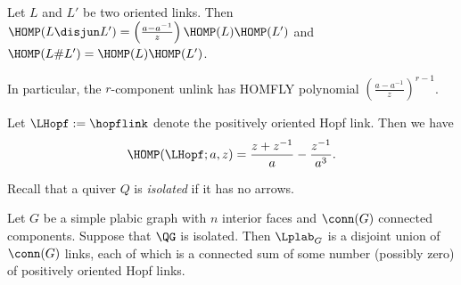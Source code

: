 \begin{proposition}\label{prop:FLYsum}
Let $L$ and $L'$ be two oriented links.  Then $\HOMP(L \disjun L') = \left(\frac{a-a^{-1}}{z}\right)\HOMP(L)\HOMP(L')$ and $\HOMP(L \#L') = \HOMP(L) \HOMP(L')$. 
\end{proposition}
In particular, the $r$-component unlink has HOMFLY polynomial $\left(\frac{a-a^{-1}}{z}\right)^{r-1}$.

Let $\LHopf:=\hopflink$ denote the positively oriented Hopf link.  Then we have 
\begin{equation}\label{eq:Hopf}
\HOMP({\LHopf};a,z) = \frac{z + z^{-1}}{a} - \frac{z^{-1}}{a^{3}}.
\end{equation}



Recall that a quiver $Q$ is \emph{isolated} if it has no arrows.
\begin{proposition}\label{prop:plabic_isolated}
Let $G$ be a simple plabic graph with $n$ interior faces and $\conn(G)$ connected components. Suppose that $\QG$ is isolated. Then $\Lplab_G$ is a disjoint union of $\conn(G)$ links, each of which is a connected sum of some number (possibly zero) of positively oriented Hopf links. 
\end{proposition}
